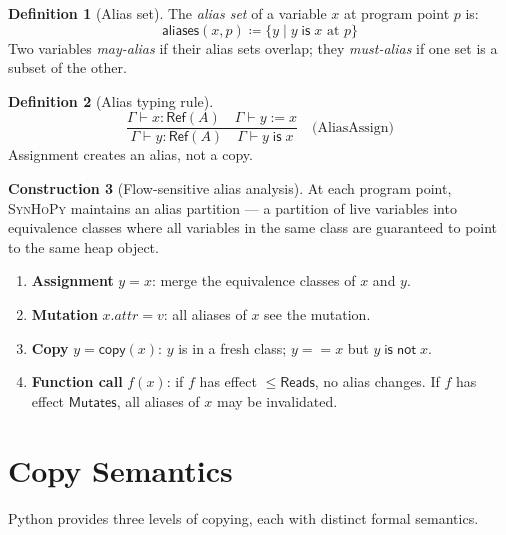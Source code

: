 \documentclass[11pt,a4paper]{report}
\theoremstyle{definition}
\newtheorem{definition}{Definition}[chapter]
\newtheorem{construction}[definition]{Construction}
\theoremstyle{plain}
\newcommand{\defeq}{\coloneqq}
\newcommand{\Reads}{\mathsf{Reads}}
\newcommand{\Mutates}{\mathsf{Mutates}}
\newcommand{\synhopy}{\textsc{SynHoPy}}
\begin{document}
\begin{definition}[Alias set]
The \emph{alias set} of a variable $x$ at program point $p$ is:
\[
  \mathsf{aliases}(x, p) \defeq \{ y \mid y \;\mathsf{is}\; x \text{ at } p \}
\]
Two variables \emph{may-alias} if their alias sets overlap; they \emph{must-alias}
if one set is a subset of the other.
\end{definition}

\begin{definition}[Alias typing rule]
\[
  \frac{
    \Gamma \vdash x : \mathsf{Ref}(A) \quad
    \Gamma \vdash y \mathbin{:=} x
  }{
    \Gamma \vdash y : \mathsf{Ref}(A) \quad
    \Gamma \vdash y \;\mathsf{is}\; x
  } \quad \text{(AliasAssign)}
\]
Assignment creates an alias, not a copy.
\end{definition}

\begin{construction}[Flow-sensitive alias analysis]
At each program point, \synhopy{} maintains an alias partition --- a
partition of live variables into equivalence classes where all variables in the
same class are guaranteed to point to the same heap object.
\begin{enumerate}
  \item \textbf{Assignment} $y = x$: merge the equivalence classes of $x$ and $y$.
  \item \textbf{Mutation} $x.attr = v$: all aliases of $x$ see the mutation.
  \item \textbf{Copy} $y = \mathsf{copy}(x)$: $y$ is in a fresh class; $y == x$ but $y\;\mathsf{is\;not}\;x$.
  \item \textbf{Function call} $f(x)$: if $f$ has effect $\leq \Reads$, no alias changes.
    If $f$ has effect $\Mutates$, all aliases of $x$ may be invalidated.
\end{enumerate}
\end{construction}


\section{Copy Semantics}

Python provides three levels of copying, each with distinct formal semantics.
\end{document}
